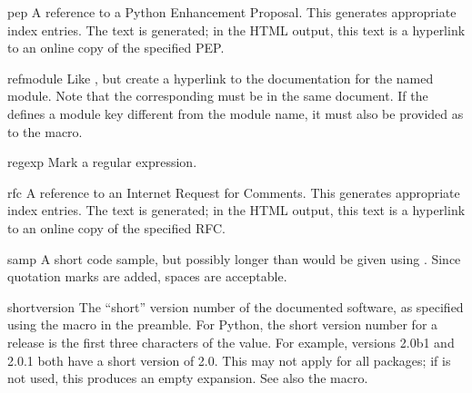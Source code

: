 \documentclass{howto}
\begin{document}
    \begin{macrodesc}{pep}{}
      A reference to a Python Enhancement Proposal.  This generates
      appropriate index entries.  The text  is
      generated; in the HTML output, this text is a hyperlink to an
      online copy of the specified PEP.
    \end{macrodesc}

    \begin{macrodesc}{refmodule}{}
      Like , but create a hyperlink to the documentation 
      for the named module.  Note that the corresponding
       must be in the same document.  If the
       defines a module key different from the
      module name, it must also be provided as  to the
       macro.
    \end{macrodesc}

    \begin{macrodesc}{regexp}{}
      Mark a regular expression.
    \end{macrodesc}

    \begin{macrodesc}{rfc}{}
      A reference to an Internet Request for Comments.  This generates 
      appropriate index entries.  The text  is
      generated; in the HTML output, this text is a hyperlink to an
      online copy of the specified RFC.
    \end{macrodesc}

    \begin{macrodesc}{samp}{}
      A short code sample, but possibly longer than would be given
      using .  Since quotation marks are added, spaces are 
      acceptable.
    \end{macrodesc}

    \begin{macrodesc}{shortversion}{}
      The ``short'' version number of the documented software, as
      specified using the  macro in the
      preamble.  For Python, the short version number for a release is
      the first three characters of the  value.  For
      example, versions 2.0b1 and 2.0.1 both have a short version of
      2.0.  This may not apply for all packages; if
       is not used, this produces an empty
      expansion.  See also the  macro.
    \end{macrodesc}
\end{document}
